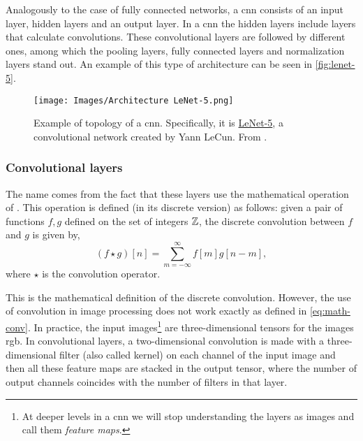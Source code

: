 Analogously to the case of fully connected networks, a \gls{cnn} consists of an
input layer, hidden layers and an output layer. In a \gls{cnn} the hidden
layers include layers that calculate convolutions. These convolutional layers
are followed by different ones, among which the pooling layers, fully connected
layers and normalization layers stand out. An example of this type of
architecture can be seen in \vref{fig:lenet-5}.

\begin{figure}[ht]
  \centering
  \texttt{[image: Images/Architecture LeNet-5.png]}
  \caption[Example of topology of a  (LeNet-5)]{Example of
    topology of a \gls{cnn}. Specifically, it is
    \href{http://yann.lecun.com/exdb/lenet}{LeNet-5}, a convolutional network
    created by Yann LeCun. From .}\label{fig:lenet-5}
\end{figure}

\subsubsection{Convolutional layers}

The name comes from the fact that these layers use the mathematical operation
of . This
operation is defined (in its discrete version) as follows: given a pair of
functions \(f, g\) defined on the set of integers \(\mathbb{Z}\), the discrete
convolution between \(f\) and \(g\) is given by,
\begin{equation} \label{eq:math-conv}
  (f \star g)[n] = \sum_{m=-\infty}^{\infty} f[m]g[n - m],
\end{equation}
where \(\star\) is the convolution operator.

This is the mathematical definition of the discrete convolution. However, the
use of convolution in image processing does not work exactly as defined in
\vref{eq:math-conv}. In practice, the input images\footnote{At deeper levels in
  a \gls{cnn} we will stop understanding the layers as images and call them
  \emph{feature maps}.} are three-dimensional tensors for the images
\acs{rgb}. In convolutional layers, a two-dimensional convolution is made with
a three-dimensional filter (also called kernel) on each channel of the input
image and then all these feature maps are stacked in the output tensor, where
the number of output channels coincides with the number of filters in that
layer.

